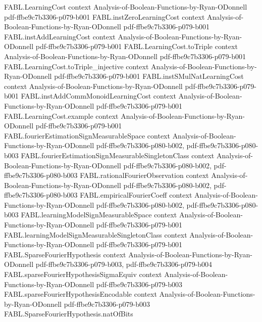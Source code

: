 \begin{theorem}
\proofstep
  {FABL.LearningCost}
  {context}
  {Analysis-of-Boolean-Functions-by-Ryan-ODonnell}
  {pdf-ffbe9c7b3306-p079-b001}
\proofstep
  {FABL.instZeroLearningCost}
  {context}
  {Analysis-of-Boolean-Functions-by-Ryan-ODonnell}
  {pdf-ffbe9c7b3306-p079-b001}
\proofstep
  {FABL.instAddLearningCost}
  {context}
  {Analysis-of-Boolean-Functions-by-Ryan-ODonnell}
  {pdf-ffbe9c7b3306-p079-b001}
\proofstep
  {FABL.LearningCost.toTriple}
  {context}
  {Analysis-of-Boolean-Functions-by-Ryan-ODonnell}
  {pdf-ffbe9c7b3306-p079-b001}
\proofstep
  {FABL.LearningCost.toTriple_injective}
  {context}
  {Analysis-of-Boolean-Functions-by-Ryan-ODonnell}
  {pdf-ffbe9c7b3306-p079-b001}
\proofstep
  {FABL.instSMulNatLearningCost}
  {context}
  {Analysis-of-Boolean-Functions-by-Ryan-ODonnell}
  {pdf-ffbe9c7b3306-p079-b001}
\proofstep
  {FABL.instAddCommMonoidLearningCost}
  {context}
  {Analysis-of-Boolean-Functions-by-Ryan-ODonnell}
  {pdf-ffbe9c7b3306-p079-b001}
\proofstep
  {FABL.LearningCost.example}
  {context}
  {Analysis-of-Boolean-Functions-by-Ryan-ODonnell}
  {pdf-ffbe9c7b3306-p079-b001}
\proofstep
  {FABL.fourierEstimationSignMeasurableSpace}
  {context}
  {Analysis-of-Boolean-Functions-by-Ryan-ODonnell}
  {pdf-ffbe9c7b3306-p080-b002,
    pdf-ffbe9c7b3306-p080-b003}
\proofstep
  {FABL.fourierEstimationSignMeasurableSingletonClass}
  {context}
  {Analysis-of-Boolean-Functions-by-Ryan-ODonnell}
  {pdf-ffbe9c7b3306-p080-b002,
    pdf-ffbe9c7b3306-p080-b003}
\proofstep
  {FABL.rationalFourierObservation}
  {context}
  {Analysis-of-Boolean-Functions-by-Ryan-ODonnell}
  {pdf-ffbe9c7b3306-p080-b002,
    pdf-ffbe9c7b3306-p080-b003}
\proofstep
  {FABL.empiricalFourierCoeff}
  {context}
  {Analysis-of-Boolean-Functions-by-Ryan-ODonnell}
  {pdf-ffbe9c7b3306-p080-b002,
    pdf-ffbe9c7b3306-p080-b003}
\proofstep
  {FABL.learningModelSignMeasurableSpace}
  {context}
  {Analysis-of-Boolean-Functions-by-Ryan-ODonnell}
  {pdf-ffbe9c7b3306-p079-b001}
\proofstep
  {FABL.learningModelSignMeasurableSingletonClass}
  {context}
  {Analysis-of-Boolean-Functions-by-Ryan-ODonnell}
  {pdf-ffbe9c7b3306-p079-b001}
\proofstep
  {FABL.SparseFourierHypothesis}
  {context}
  {Analysis-of-Boolean-Functions-by-Ryan-ODonnell}
  {pdf-ffbe9c7b3306-p079-b003,
    pdf-ffbe9c7b3306-p079-b004}
\proofstep
  {FABL.sparseFourierHypothesisSigmaEquiv}
  {context}
  {Analysis-of-Boolean-Functions-by-Ryan-ODonnell}
  {pdf-ffbe9c7b3306-p079-b003}
\proofstep
  {FABL.sparseFourierHypothesisEncodable}
  {context}
  {Analysis-of-Boolean-Functions-by-Ryan-ODonnell}
  {pdf-ffbe9c7b3306-p079-b003}
\proofstep
  {FABL.SparseFourierHypothesis.natOfBits}

\end{theorem}
